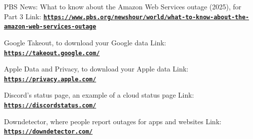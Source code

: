 \documentclass[12pt]{article}
\begin{document}
PBS News: What to know about the Amazon Web Services outage (2025), for Part 3
Link: \href{https://www.pbs.org/newshour/world/what-to-know-about-the-amazon-web-services-outage}{\textbf{\nolinkurl{https://www.pbs.org/newshour/world/what-to-know-about-the-amazon-web-services-outage}}}

Google Takeout, to download your Google data
Link: \href{https://takeout.google.com/}{\textbf{\nolinkurl{https://takeout.google.com/}}}

Apple Data and Privacy, to download your Apple data
Link: \href{https://privacy.apple.com/}{\textbf{\nolinkurl{https://privacy.apple.com/}}}

Discord's status page, an example of a cloud status page
Link: \href{https://discordstatus.com/}{\textbf{\nolinkurl{https://discordstatus.com/}}}

Downdetector, where people report outages for apps and websites
Link: \href{https://downdetector.com/}{\textbf{\nolinkurl{https://downdetector.com/}}}
\end{document}
